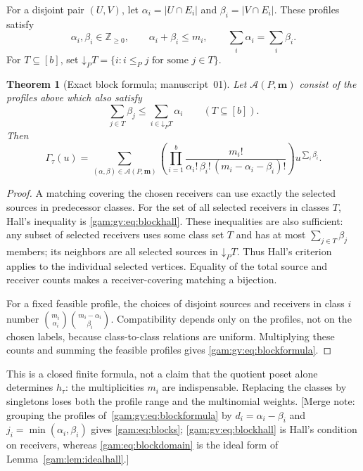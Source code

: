\documentclass[11pt]{article}
\numberwithin{equation}{section}
\newtheorem{theorem}{Theorem}[section]
\theoremstyle{definition}
\newcommand{\N}{\mathbb Z_{\geq0}}
\newcommand{\down}{\mathord\downarrow}
\begin{document}
For a disjoint pair $(U,V)$, let
$\alpha_i=|U\cap E_i|$ and $\beta_i=|V\cap E_i|$. These profiles satisfy
\[
 \alpha_i,\beta_i\in\N,\qquad \alpha_i+\beta_i\le m_i,
 \qquad \sum_i\alpha_i=\sum_i\beta_i.
\]
For $T\subseteq[b]$, set
$\down_P T=\{i:i\le_P j\text{ for some }j\in T\}$.

\begin{theorem}[Exact block formula; manuscript~01]\label{gam:gv:thm:blocks}
Let $\mathcal A(P,\mathbf m)$ consist of the profiles above which also satisfy
\begin{equation}
 \sum_{j\in T}\beta_j\le
        \sum_{i\in\down_P T}\alpha_i
                   \qquad(T\subseteq[b]).
 \label{gam:gv:eq:blockhall}
\end{equation}
Then
\begin{equation}
 \boxed{\displaystyle
 \Gamma_\tau(u)=\sum_{(\alpha,\beta)\in\mathcal A(P,\mathbf m)}
   \left(\prod_{i=1}^b
       \frac{m_i!}{\alpha_i!\,\beta_i!\,(m_i-\alpha_i-\beta_i)!}\right)
         u^{\sum_i\beta_i}.}
 \label{gam:gv:eq:blockformula}
\end{equation}
\end{theorem}
\begin{proof}
A matching covering the chosen receivers can use exactly the selected
sources in predecessor classes. For the set of all selected receivers in
classes $T$, Hall's inequality is \eqref{gam:gv:eq:blockhall}. These inequalities
are also sufficient: any subset of selected receivers uses some class set
$T$ and has at most $\sum_{j\in T}\beta_j$ members; its neighbors are all
selected sources in $\down_P T$. Thus Hall's criterion applies to the
individual selected vertices. Equality of the total source and receiver
counts makes a receiver-covering matching a bijection.

For a fixed feasible profile, the choices of disjoint sources and receivers
in class $i$ number
$\binom{m_i}{\alpha_i}\binom{m_i-\alpha_i}{\beta_i}$.
Compatibility depends only on the profiles, not on the chosen labels,
because class-to-class relations are uniform. Multiplying these counts and
summing the feasible profiles gives \eqref{gam:gv:eq:blockformula}.
\end{proof}
This is a closed finite formula, not a claim that the quotient poset alone
determines $h_\tau$: the multiplicities $m_i$ are indispensable. Replacing
the classes by singletons loses both the profile range and the multinomial
weights. [Merge note: grouping the profiles of~\eqref{gam:gv:eq:blockformula}
by $d_i=\alpha_i-\beta_i$ and $j_i=\min(\alpha_i,\beta_i)$ gives
\eqref{gam:eq:blocks}; \eqref{gam:gv:eq:blockhall} is Hall's condition on
receivers, whereas \eqref{gam:eq:blockdomain} is the ideal form of
Lemma~\ref{gam:lem:idealhall}.]
\end{document}
